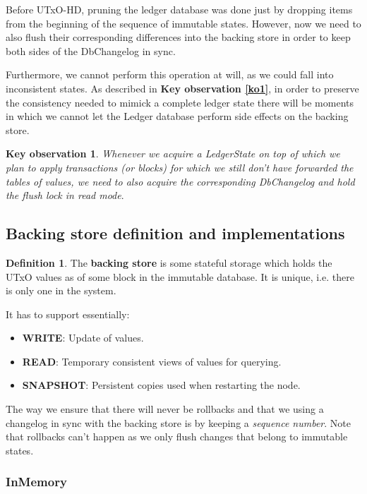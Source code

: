 \documentclass[11pt,a4paper]{article}
\theoremstyle{definition}
\newtheorem{definition}{Definition}
\newtheorem{observation}{Key observation}
\begin{document}
Before UTxO-HD, pruning the ledger database was done just by dropping items from
the beginning of the sequence of immutable states. However, now we need to also
flush their corresponding differences into the backing store in order to keep
both sides of the DbChangelog in sync.

Furthermore, we cannot perform this operation at will, as we could fall into
inconsistent states. As described in \textbf{Key observation \ref{ko1}}, in
order to preserve the consistency needed to mimick a complete ledger state there
will be moments in which we cannot let the Ledger database perform side effects
on the backing store.

\begin{observation}
  \label{ko2}
  \emph{Whenever we acquire a LedgerState on top of which we plan to apply
    transactions (or blocks) for which we still don't have forwarded the tables
    of values, we need to also acquire the corresponding DbChangelog and hold
    the flush lock in read mode}.
\end{observation}

\subsection{Backing store definition and implementations}

\begin{definition}
  The \textbf{backing store} is some stateful storage which holds the UTxO
  values as of some block in the immutable database. It is unique, i.e. there is
  only one in the system.
\end{definition}

It has to support essentially:

\begin{itemize}
  \item \textbf{WRITE}: Update of values.
  \item \textbf{READ}: Temporary consistent views of values for querying.
  \item \textbf{SNAPSHOT}: Persistent copies used when restarting the node.
\end{itemize}

The way we ensure that there will never be rollbacks and that we using a
changelog in sync with the backing store is by keeping a \emph{sequence number}.
Note that rollbacks can't happen as we only flush changes that belong to
immutable states.

\subsubsection{InMemory}
\end{document}
